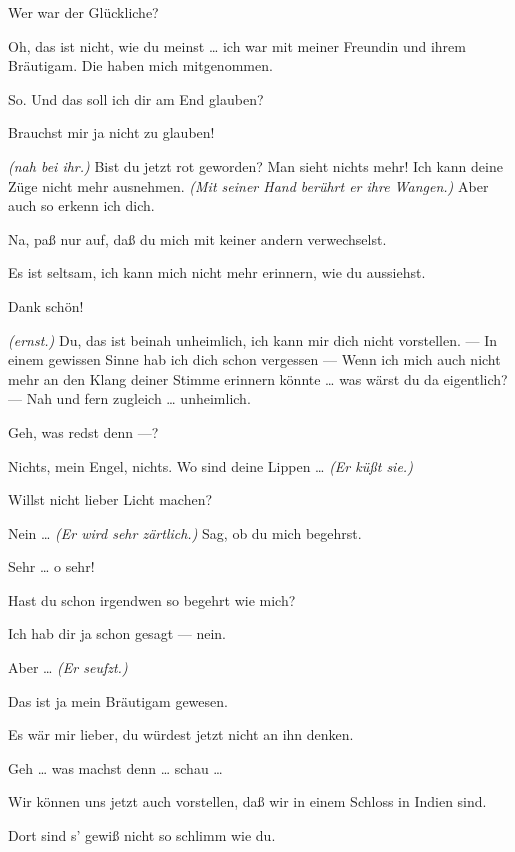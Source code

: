 \documentclass[
	final,
	a4paper,
	ngerman,
	mpinclude = true, %
	twoside = true,
	open = right,
	cleardoublepage = plain,
	DIV = 13,
	BCOR = 1cm,
	titlepage = firstiscover,
	]{scrbook}
\newcommand{\marginnote}[1]{\marginpar{\singlespacing\raggedright\footnotesize#1}}
\newcommand{\direction}[1]{\textit{(#1)}}
\newcommand{\thecharacter}[1]{\textup{\textsc{#1}}\xspace}
\newcommand{\thesuesse}{\thecharacter{Süßes Mädel}}
\newcommand{\thedichter}{\thecharacter{Dichter}}
\newcommand{\character}[1]{\item[#1:]}
\newcommand{\suesse}{\character{\thesuesse}}
\newcommand{\dichter}{\character{\thedichter}}
\begin{document}
\begin{play}
	\dichter
	Wer war der Glückliche?

	\suesse
	Oh, das ist nicht, wie du meinst \ldots{} ich war mit meiner Freundin und ihrem Bräutigam. Die haben mich mitgenommen.

	\dichter
	So. Und das soll ich dir am End glauben?

	\suesse
	Brauchst mir ja nicht zu glauben!

	\dichter
	\direction{nah bei ihr.} Bist du jetzt rot geworden? Man sieht nichts mehr! Ich kann deine Züge nicht mehr ausnehmen. \direction{Mit seiner Hand berührt er ihre Wangen.} Aber auch so erkenn ich dich.

	\suesse
	Na, paß nur auf, daß du mich mit keiner andern verwechselst.

	\dichter
	Es ist seltsam, ich kann mich nicht mehr erinnern, wie du aussiehst.

	\suesse
	Dank schön!

	\dichter
	\direction{ernst.} Du, das ist beinah unheimlich, ich kann mir dich nicht vorstellen. --- In einem gewissen Sinne hab ich dich schon vergessen --- Wenn ich mich auch nicht mehr an den Klang deiner Stimme erinnern könnte \ldots{} was wärst du da eigentlich? --- Nah und fern zugleich \ldots{} unheimlich.

	\marginnote{\enquote{Digga, was labersch du?}}
	\suesse
	Geh, was redst denn ---?

	\dichter
	Nichts, mein Engel, nichts. Wo sind deine Lippen \ldots{} \direction{Er küßt sie.}

	\suesse
	Willst nicht lieber Licht machen?

	\dichter
	Nein \ldots{} \direction{Er wird sehr zärtlich.} Sag, ob du mich begehrst.

	\suesse
	Sehr \ldots{} o sehr!

	\dichter
	Hast du schon irgendwen so begehrt wie mich?

	\suesse
	Ich hab dir ja schon gesagt --- nein.

	\dichter
	Aber \ldots{} \direction{Er seufzt.}

	\suesse
	Das ist ja mein Bräutigam gewesen.

	\dichter
	Es wär mir lieber, du würdest jetzt nicht an ihn denken.

	\suesse
	Geh \ldots{} was machst denn \ldots{} schau \ldots{}

	\dichter
	Wir können uns jetzt auch vorstellen, daß wir in einem Schloss in Indien sind.

	\suesse
	Dort sind s' gewiß nicht so schlimm wie du.


\end{play}
\end{document}
